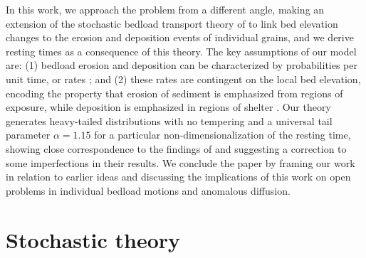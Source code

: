 \documentclass[draft]{agujournal2018}
\begin{document}
In this work, we approach the problem from a different angle, making an extension of the stochastic bedload transport theory of \citet{Ancey2008} to link bed elevation changes to the erosion and deposition events of individual grains, and we derive resting times as a consequence of this theory.
The key assumptions of our model are: (1) bedload erosion and deposition can be characterized by probabilities per unit time, or rates \citep[e.g.][]{Einstein1950, Ancey2008}; and (2) these rates are contingent on the local bed elevation, encoding the property that erosion of sediment is emphasized from regions of exposure, while deposition is emphasized in regions of shelter \citep[e.g.][]{Sawai1987, Wong2007}.
Our theory generates heavy-tailed distributions with no tempering and a universal tail parameter $\alpha = 1.15$ for a particular non-dimensionalization of the resting time, showing close correspondence to the findings of \citet{Martin2014} and suggesting a correction to some imperfections in their results.
We conclude the paper by framing our work in relation to earlier ideas and discussing the implications of this work on open problems in individual bedload motions and anomalous diffusion.

\section{Stochastic theory}
\label{sec:theory}
\end{document}
